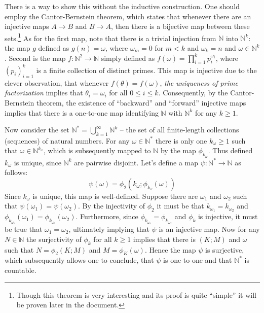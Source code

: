 \documentclass[a4paper]{article}
\newcommand{\brac}[1]{{\left({#1}\right)}}
\begin{document}
There is a way to show this without the inductive construction. One should employ the Cantor-Bernstein theorem, which states that whenever there are an injective maps $A\to B$ and $B\to A$, then there is a bijective map between these sets.\footnote{Though this theorem is very interesting and its proof is quite ``simple'' it will be proven later in the document.}
As for the first map, note that there is a trivial injection from $\mathbb{N}$ into $\mathbb{N}^k$: the map $g$ defined as $g(n)=\omega$, where $\omega_m = 0$ for $m<k$ and $\omega_k = n$ and $\omega\in\mathbb{N}^k$.
Second is the map $f:\mathbb{N}^2\to \mathbb{N}$ simply defined as $f(\omega) = \prod_{i=1}^k p_i^{\omega_i}$, where $\brac{p_i}_{i=1}^k$ is a finite collection of distinct primes. This map is injective due to the clever observation, that whenever $f(\theta) = f(\omega)$, \emph{the uniqueness of prime factorization} implies that $\theta_i=\omega_i$ for all $0 \leq i \leq k$.
Consequently, by the Cantor-Bernstein theorem, the existence of ``backward'' and ``forward'' injective maps implies that there is a one-to-one map identifying $\mathbb{N}$ with $\mathbb{N}^k$ for any $k\geq 1$.

Now consider the set $\mathbb{N}^* = \bigcup_{k=1}^\infty \mathbb{N}^k$ -- the set of all finite-length collections (sequences) of natural numbers. For any $\omega \in\mathbb{N}^*$ there is only one $k_\omega \geq 1$ such that $\omega \in \mathbb{N}^{k_\omega}$, which is subsequently mapped to $\mathbb{N}$ by the map $\phi_{k_\omega}$. Thus defined $k_\omega$ is unique, since $\mathbb{N}^k$ are pairwise disjoint. Let's define a map $\psi:\mathbb{N}^*\to \mathbb{N}$ as follows: \[\psi(\omega) = \phi_2(k_\omega;\phi_{k_\omega}(\omega))\] Since $k_\omega$ is unique, this map is well-defined. Suppose there are $\omega_1$ and $\omega_2$ such that $\psi(\omega_1)=\psi(\omega_2)$. By the injectivity of $\phi_2$ it must be that $k_{\omega_1}=k_{\omega_2}$ and $\phi_{k_{\omega_1}}(\omega_1)=\phi_{k_{\omega_2}}(\omega_2)$. Furthermore, since $\phi_{k_{\omega_1}}=\phi_{k_{\omega_2}}$ and $\phi_k$ is injective, it must be true that $\omega_1 = \omega_2$, ultimately implying that $\psi$ is an injective map. Now for any $N\in \mathbb{N}$ the surjectivity of $\phi_k$ for all $k\geq 1$ implies that there is $(K;M)$ and $\omega$ such that $N=\phi_2(K;M)$ and $M=\phi_K(\omega)$. Hence the map $\psi$ is surjective, which subsequently allows one to conclude, that $\psi$ is one-to-one and that $\mathbb{N}^*$ is countable.
\end{document}
